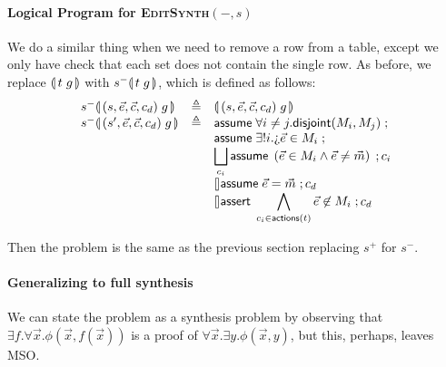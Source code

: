 \paragraph{Logical Program for \textsc{EditSynth}$(-,s)$}

We do a similar thing when we need to remove a row from a table, except we only
have check that each set does not contain the single row. As before, we replace
$\llparenthesis\, t\;g\, \rrparenthesis$ with $s^-\llparenthesis\, t\; g\, \rrparenthesis$, which is defined as follows:
\[\begin{array}{lcl}
    s^-\parenbb{(s,\vec e, \vec c, c_d) \; g}
    &\triangleq
    & \parenbb{(s,\vec e, \vec c, c_d) \; g} \\
    s^-\parenbb{(s',\vec e, \vec c, c_d) \; g}
    &\triangleq
    & \assume{\forall i\neq j. \mathsf{disjoint}(M_i,M_j)}; \\
    && \assume{\exists! i. \hole{\vec e} \in M_i};\\
    && \displaystyle \Angel_{c_i}
       \assume{\left(\vec e \in M_i\wedge \vec e \neq \vec m \right )}; c_i\\
    && \angel \assume{\vec e = \vec m}; c_d \\
    && \displaystyle \angel \assert{\bigwedge_{c_i \in \actions t} \vec e \not\in M_i}; c_d
\end{array}\]

Then the problem is the same as the previous section replacing $s^+$ for $s^-$.

\paragraph{Generalizing to full synthesis}

We can state the problem as a synthesis problem by observing that
$\exists f. \forall \vec x. \phi(\vec x, f(\vec x))$ is a proof of
$\forall \vec x. \exists y. \phi(\vec x, y)$, but this, perhaps, leaves MSO.

